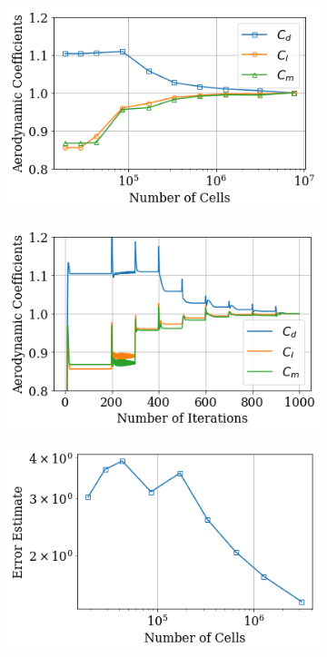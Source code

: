 \begin{figure}[ht]
	\begin{subfigure}{.5\textwidth}
		\centering
		\includegraphics[width=0.99\linewidth]{figures/3_vehicle_design/CartCoeffs_cells}
		\caption{}
	\end{subfigure}
	\begin{subfigure}{.5\textwidth}
		\centering
		\includegraphics[width=0.99\linewidth]{figures/3_vehicle_design/CartCoeffs_its}
		\caption{}
		
	\end{subfigure}
	\begin{subfigure}{.5\textwidth}
		\centering
		\includegraphics[width=0.9\linewidth]{figures/3_vehicle_design/ErrorEst}
		\caption{}
		

\end{subfigure}
\end{figure}

